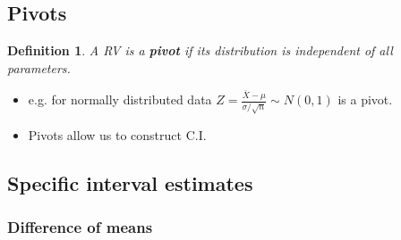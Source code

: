 \documentclass[10pt, two column]{article}
\newtheorem{definition}{Definition}[subsection]
\begin{document}
\subsection{Pivots}

\begin{definition}
A RV is a {\bf pivot} if its distribution is independent of all parameters. 
\end{definition}
\begin{itemize}
\item e.g. for normally distributed data $Z = \frac{\overline{X} - \mu}{\sigma / \sqrt{n}} \sim N(0,1)$ is a pivot. 
\item Pivots allow us to construct C.I.
\end{itemize}

\subsection{Specific interval estimates}

\subsubsection{Difference of means} \label{diff. of means}
\end{document}
